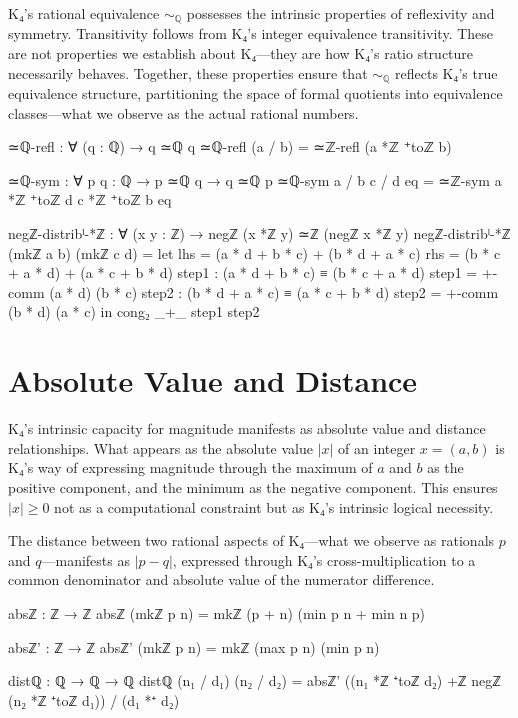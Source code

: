 \documentclass[11pt,a4paper]{book}
\begin{document}
K₄'s rational equivalence $\sim_{\mathbb{Q}}$ possesses the intrinsic properties of reflexivity and symmetry. Transitivity follows from K₄'s integer equivalence transitivity. These are not properties we establish about K₄—they are how K₄'s ratio structure necessarily behaves. Together, these properties ensure that $\sim_{\mathbb{Q}}$ reflects K₄'s true equivalence structure, partitioning the space of formal quotients into equivalence classes—what we observe as the actual rational numbers.

\begin{code}
≃ℚ-refl : ∀ (q : ℚ) → q ≃ℚ q
≃ℚ-refl (a / b) = ≃ℤ-refl (a *ℤ ⁺toℤ b)

≃ℚ-sym : ∀ {p q : ℚ} → p ≃ℚ q → q ≃ℚ p
≃ℚ-sym {a / b} {c / d} eq = ≃ℤ-sym {a *ℤ ⁺toℤ d} {c *ℤ ⁺toℤ b} eq

negℤ-distribˡ-*ℤ : ∀ (x y : ℤ) → negℤ (x *ℤ y) ≃ℤ (negℤ x *ℤ y)
negℤ-distribˡ-*ℤ (mkℤ a b) (mkℤ c d) = 
  let lhs = (a * d + b * c) + (b * d + a * c)
      rhs = (b * c + a * d) + (a * c + b * d)
      step1 : (a * d + b * c) ≡ (b * c + a * d)
      step1 = +-comm (a * d) (b * c)
      step2 : (b * d + a * c) ≡ (a * c + b * d)
      step2 = +-comm (b * d) (a * c)
  in cong₂ _+_ step1 step2
\end{code}

\section{Absolute Value and Distance}

K₄'s intrinsic capacity for magnitude manifests as absolute value and distance relationships. What appears as the absolute value $|x|$ of an integer $x = (a,b)$ is K₄'s way of expressing magnitude through the maximum of $a$ and $b$ as the positive component, and the minimum as the negative component. This ensures $|x| \ge 0$ not as a computational constraint but as K₄'s intrinsic logical necessity.

The distance between two rational aspects of K₄—what we observe as rationals $p$ and $q$—manifests as $|p - q|$, expressed through K₄'s cross-multiplication to a common denominator and absolute value of the numerator difference.

\begin{code}
absℤ : ℤ → ℤ
absℤ (mkℤ p n) = mkℤ (p + n) (min p n + min n p)

absℤ' : ℤ → ℤ
absℤ' (mkℤ p n) = mkℤ (max p n) (min p n)

distℚ : ℚ → ℚ → ℚ
distℚ (n₁ / d₁) (n₂ / d₂) = absℤ' ((n₁ *ℤ ⁺toℤ d₂) +ℤ negℤ (n₂ *ℤ ⁺toℤ d₁)) / (d₁ *⁺ d₂)
\end{code}
\end{document}
